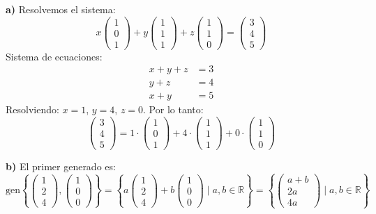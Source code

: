 \documentclass[11pt]{article}
\begin{document}
\begin{tcolorbox}[colback=green1!10, colframe=green1, title=Solución]
\textbf{a)} Resolvemos el sistema:
\[
x\begin{pmatrix}1\\0\\1\end{pmatrix} + y\begin{pmatrix}1\\1\\1\end{pmatrix} + z\begin{pmatrix}1\\1\\0\end{pmatrix} = \begin{pmatrix}3\\4\\5\end{pmatrix}
\]
Sistema de ecuaciones:
\begin{align*}
x + y + z &= 3 \\
y + z &= 4 \\
x + y &= 5
\end{align*}
Resolviendo: $x = 1$, $y = 4$, $z = 0$. Por lo tanto:
\[
\begin{pmatrix}3\\4\\5\end{pmatrix} = 1\cdot\begin{pmatrix}1\\0\\1\end{pmatrix} + 4\cdot\begin{pmatrix}1\\1\\1\end{pmatrix} + 0\cdot\begin{pmatrix}1\\1\\0\end{pmatrix}
\]

\textbf{b)} El primer generado es:
\[
\text{gen}\left\{\begin{pmatrix}1\\2\\4\end{pmatrix},\begin{pmatrix}1\\0\\0\end{pmatrix}\right\} = 
\left\{a\begin{pmatrix}1\\2\\4\end{pmatrix} + b\begin{pmatrix}1\\0\\0\end{pmatrix} \mid a,b\in\mathbb{R}\right\}
= \left\{\begin{pmatrix}a+b\\2a\\4a\end{pmatrix} \mid a,b\in\mathbb{R}\right\}
\]


\end{tcolorbox}
\end{document}
